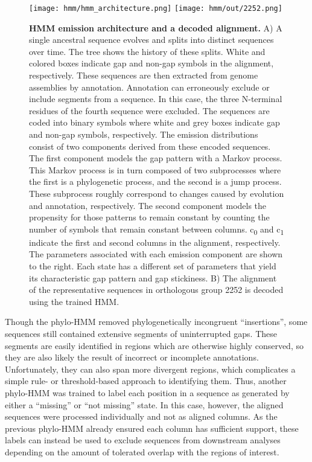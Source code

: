\documentclass[10pt,letterpaper]{article}
\begin{document}
\begin{figure}[h!]
\texttt{[image: hmm/hmm\_architecture.png]}
\texttt{[image: hmm/out/2252.png]}
\centering
\caption{\textbf{HMM emission architecture and a decoded alignment.}
A) A single ancestral sequence evolves and splits into distinct sequences over time. The tree shows the history of these splits. White and colored boxes indicate gap and non-gap symbols in the alignment, respectively. These sequences are then extracted from genome assemblies by annotation. Annotation can erroneously exclude or include segments from a sequence. In this case, the three N-terminal residues of the fourth sequence were excluded. The sequences are coded into binary symbols where white and grey boxes indicate gap and non-gap symbols, respectively. The emission distributions consist of two components derived from these encoded sequences. The first component models the gap pattern with a Markov process. This Markov process is in turn composed of two subprocesses where the first is a phylogenetic process, and the second is a jump process. These subprocess roughly correspond to changes caused by evolution and annotation, respectively. The second component models the propensity for those patterns to remain constant by counting the number of symbols that remain constant between columns. c\textsubscript{0} and c\textsubscript{1} indicate the first and second columns in the alignment, respectively. The parameters associated with each emission component are shown to the right. Each state has a different set of parameters that yield its characteristic gap pattern and gap stickiness. B) The alignment of the representative sequences in orthologous group 2252 is decoded using the trained HMM.}
\label{fig:hmm}
\end{figure}

Though the phylo-HMM removed phylogenetically incongruent ``insertions'', some sequences still contained extensive segments of uninterrupted gaps. These segments are easily identified in regions which are otherwise highly conserved, so they are also likely the result of incorrect or incomplete annotations. Unfortunately, they can also span more divergent regions, which complicates a simple rule- or threshold-based approach to identifying them. Thus, another phylo-HMM was trained to label each position in a sequence as generated by either a ``missing'' or ``not missing'' state. In this case, however, the aligned sequences were processed individually and not as aligned columns. As the previous phylo-HMM already ensured each column has sufficient support, these labels can instead be used to exclude sequences from downstream analyses depending on the amount of tolerated overlap with the regions of interest.
\end{document}
